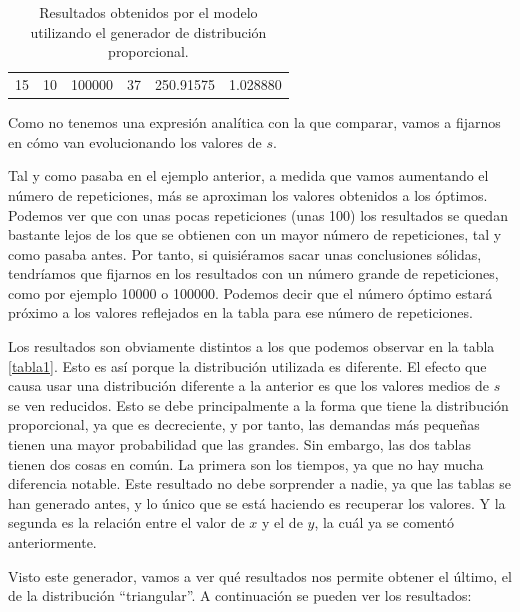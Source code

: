 \documentclass[11pt,a4paper]{report}
\begin{document}
\begin{table}[H]
{\begin{tabular}{c|c|c|c|c|c}
15                                                                                   & 10                                                                                     & 100000                                                                    & 37                                                                                        & 250.91575                                                                 & 1.028880             
\end{tabular}%
}
\caption{Resultados obtenidos por el modelo utilizando el generador de distribución proporcional.}
\label{tabla2}
\end{table}

Como no tenemos una expresión analítica con la que comparar, vamos a fijarnos en cómo van evolucionando los valores
de $s$.

Tal y como pasaba en el ejemplo anterior, a medida que vamos aumentando el número de repeticiones, más se aproximan los
valores obtenidos a los óptimos. Podemos ver que con unas pocas repeticiones (unas 100) los resultados se quedan bastante lejos
de los que se obtienen con un mayor número de repeticiones, tal y como pasaba antes. Por tanto, si quisiéramos
sacar unas conclusiones sólidas, tendríamos que fijarnos en los resultados con un número grande de repeticiones, como
por ejemplo 10000 o 100000. Podemos decir que el número óptimo estará próximo a los valores reflejados en la tabla
para ese número de repeticiones.

Los resultados son obviamente distintos a los que podemos observar en la tabla \ref{tabla1}. Esto es así porque
la distribución utilizada es diferente. El efecto que causa usar una distribución diferente a la anterior es que los
valores medios de $s$ se ven reducidos. Esto se debe principalmente a la forma que tiene la distribución proporcional,
ya que es decreciente, y por tanto, las demandas más pequeñas tienen una mayor probabilidad que las grandes. Sin embargo,
las dos tablas tienen dos cosas en común. La primera son los tiempos, ya que no hay mucha diferencia notable. Este resultado no
debe sorprender a nadie, ya que las tablas se han generado antes, y lo único que se está haciendo es recuperar los valores.
Y la segunda es la relación entre el valor de $x$ y el de $y$, la cuál ya se comentó anteriormente.

Visto este generador, vamos a ver qué resultados nos permite obtener el último, el de la distribución ``triangular''.
A continuación se pueden ver los resultados:
\end{document}
